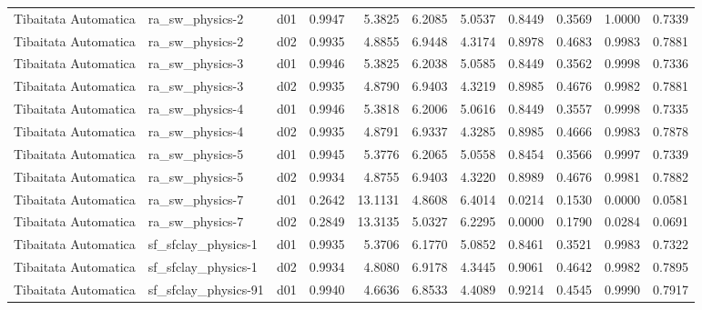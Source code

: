 \begin{longtable}{lllrrrrrrrr}
 Tibaitata Automatica  &       ra\_sw\_physics-2 &     d01 &   0.9947 &   5.3825 &   6.2085 &       5.0537 &        0.8449 &       0.3569 &           1.0000 &  0.7339 \\
 Tibaitata Automatica  &       ra\_sw\_physics-2 &     d02 &   0.9935 &   4.8855 &   6.9448 &       4.3174 &        0.8978 &       0.4683 &           0.9983 &  0.7881 \\
 Tibaitata Automatica  &       ra\_sw\_physics-3 &     d01 &   0.9946 &   5.3825 &   6.2038 &       5.0585 &        0.8449 &       0.3562 &           0.9998 &  0.7336 \\
 Tibaitata Automatica  &       ra\_sw\_physics-3 &     d02 &   0.9935 &   4.8790 &   6.9403 &       4.3219 &        0.8985 &       0.4676 &           0.9982 &  0.7881 \\
 Tibaitata Automatica  &       ra\_sw\_physics-4 &     d01 &   0.9946 &   5.3818 &   6.2006 &       5.0616 &        0.8449 &       0.3557 &           0.9998 &  0.7335 \\
 Tibaitata Automatica  &       ra\_sw\_physics-4 &     d02 &   0.9935 &   4.8791 &   6.9337 &       4.3285 &        0.8985 &       0.4666 &           0.9983 &  0.7878 \\
 Tibaitata Automatica  &       ra\_sw\_physics-5 &     d01 &   0.9945 &   5.3776 &   6.2065 &       5.0558 &        0.8454 &       0.3566 &           0.9997 &  0.7339 \\
 Tibaitata Automatica  &       ra\_sw\_physics-5 &     d02 &   0.9934 &   4.8755 &   6.9403 &       4.3220 &        0.8989 &       0.4676 &           0.9981 &  0.7882 \\
 Tibaitata Automatica  &       ra\_sw\_physics-7 &     d01 &   0.2642 &  13.1131 &   4.8608 &       6.4014 &        0.0214 &       0.1530 &           0.0000 &  0.0581 \\
 Tibaitata Automatica  &       ra\_sw\_physics-7 &     d02 &   0.2849 &  13.3135 &   5.0327 &       6.2295 &        0.0000 &       0.1790 &           0.0284 &  0.0691 \\
 Tibaitata Automatica  &   sf\_sfclay\_physics-1 &     d01 &   0.9935 &   5.3706 &   6.1770 &       5.0852 &        0.8461 &       0.3521 &           0.9983 &  0.7322 \\
 Tibaitata Automatica  &   sf\_sfclay\_physics-1 &     d02 &   0.9934 &   4.8080 &   6.9178 &       4.3445 &        0.9061 &       0.4642 &           0.9982 &  0.7895 \\
 Tibaitata Automatica  &  sf\_sfclay\_physics-91 &     d01 &   0.9940 &   4.6636 &   6.8533 &       4.4089 &        0.9214 &       0.4545 &           0.9990 &  0.7917 \\

\end{longtable}
